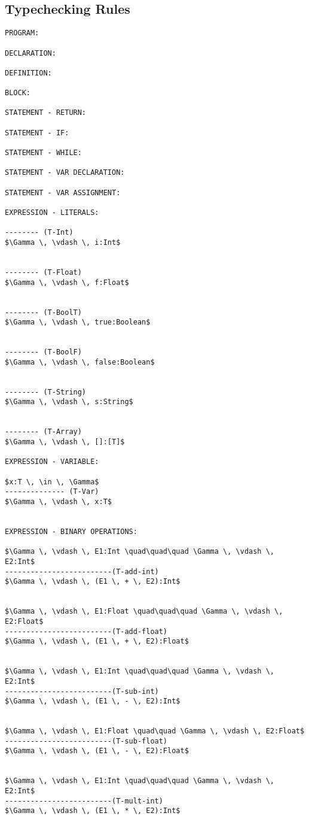 \documentclass[11pt, a4paper]{article}
\begin{document}
\subsection*{Typechecking Rules}
\begin{lstlisting}
PROGRAM:

DECLARATION:

DEFINITION:

BLOCK:

STATEMENT - RETURN:

STATEMENT - IF:

STATEMENT - WHILE:

STATEMENT - VAR DECLARATION:

STATEMENT - VAR ASSIGNMENT:

EXPRESSION - LITERALS:

-------- (T-Int)
$\Gamma \, \vdash \, i:Int$


-------- (T-Float)
$\Gamma \, \vdash \, f:Float$


-------- (T-BoolT)
$\Gamma \, \vdash \, true:Boolean$


-------- (T-BoolF)
$\Gamma \, \vdash \, false:Boolean$


-------- (T-String)
$\Gamma \, \vdash \, s:String$


-------- (T-Array)
$\Gamma \, \vdash \, []:[T]$

EXPRESSION - VARIABLE:

$x:T \, \in \, \Gamma$
-------------- (T-Var)
$\Gamma \, \vdash \, x:T$


EXPRESSION - BINARY OPERATIONS:

$\Gamma \, \vdash \, E1:Int \quad\quad\quad \Gamma \, \vdash \, E2:Int$
-------------------------(T-add-int)
$\Gamma \, \vdash \, (E1 \, + \, E2):Int$


$\Gamma \, \vdash \, E1:Float \quad\quad\quad \Gamma \, \vdash \, E2:Float$
-------------------------(T-add-float)
$\Gamma \, \vdash \, (E1 \, + \, E2):Float$


$\Gamma \, \vdash \, E1:Int \quad\quad\quad \Gamma \, \vdash \, E2:Int$
-------------------------(T-sub-int)
$\Gamma \, \vdash \, (E1 \, - \, E2):Int$


$\Gamma \, \vdash \, E1:Float \quad\quad \Gamma \, \vdash \, E2:Float$
-------------------------(T-sub-float)
$\Gamma \, \vdash \, (E1 \, - \, E2):Float$


$\Gamma \, \vdash \, E1:Int \quad\quad\quad \Gamma \, \vdash \, E2:Int$
-------------------------(T-mult-int)
$\Gamma \, \vdash \, (E1 \, * \, E2):Int$



\end{lstlisting}
\end{document}
